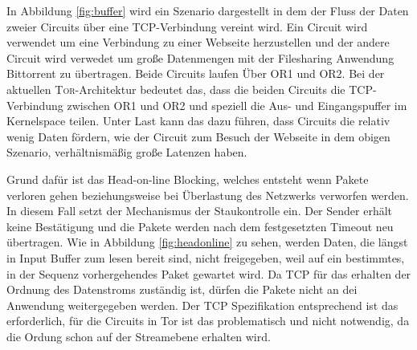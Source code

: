 \documentclass[fleqn,envcountsame,runningheads,10pt,a4paper]{llncs}
\begin{document}
\begin{figure}[h]
\end{figure} 

In Abbildung \ref{fig:buffer} wird ein Szenario dargestellt in dem der Fluss der Daten zweier Circuits über eine TCP-Verbindung vereint wird. Ein Circuit wird verwendet um eine Verbindung zu einer Webseite herzustellen und der andere Circuit wird verwedet um große Datenmengen mit der Filesharing Anwendung Bittorrent zu übertragen. Beide Circuits laufen Über OR1 und OR2. Bei der aktuellen \textsc{Tor}-Architektur bedeutet das, dass die beiden Circuits die TCP-Verbindung zwischen OR1 und OR2 und speziell die Aus- und Eingangspuffer im Kernelspace teilen. Unter Last kann das dazu führen, dass Circuits die relativ wenig Daten fördern, wie der Circuit zum Besuch der Webseite in dem obigen Szenario, verhältnismäßig große Latenzen haben.


\newpage Grund dafür ist das Head-on-line Blocking, welches entsteht wenn Pakete verloren gehen beziehungsweise bei Überlastung des Netzwerks verworfen werden. In diesem Fall setzt der Mechanismus der Staukontrolle ein. Der Sender erhält keine Bestätigung und die Pakete werden nach dem festgesetzten Timeout neu übertragen. Wie in Abbildung \ref{fig:headonline} zu sehen, werden Daten, die längst in Input Buffer zum lesen bereit sind, nicht freigegeben, weil auf ein bestimmtes, in der Sequenz vorhergehendes Paket gewartet wird. Da TCP für das erhalten der Ordnung des Datenstroms zuständig ist, dürfen die Pakete nicht an dei Anwendung weitergegeben werden. Der TCP Spezifikation entsprechend ist das erforderlich, für die Circuits in Tor ist das problematisch und nicht notwendig, da die Ordung schon auf der Streamebene erhalten wird.

\begin{figure}[h]
\end{figure}
\end{document}
